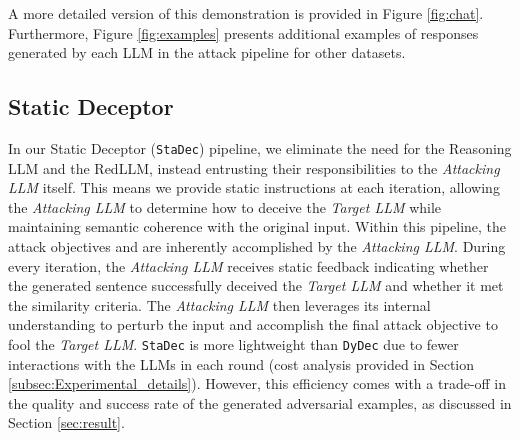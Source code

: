 \documentclass[11pt]{article}
\newcommand \dydec[0]{\texttt{DyDec}}
\newcommand \stadec[0]{\texttt{StaDec}}
\newcommand \targetLLM[0]{\textsl{Target LLM}}
\newcommand \attackingLLM[0]{\textsl{Attacking LLM}}
\begin{document}
A more detailed version of this demonstration is provided in Figure \ref{fig:chat}. Furthermore, Figure \ref{fig:examples} presents additional examples of responses generated by each LLM in the attack pipeline for other datasets.

\subsection{Static Deceptor}
\label{sec:stadec_description}

In our Static Deceptor (\stadec) pipeline, we eliminate the need for the Reasoning LLM and the RedLLM, instead entrusting their responsibilities to the \attackingLLM{} itself. This means we provide static instructions at each iteration, allowing the \attackingLLM{} to determine how to deceive the \targetLLM{} while maintaining semantic coherence with the original input. Within this pipeline, the attack objectives  and  are inherently accomplished by the \attackingLLM{}. During every iteration, the \attackingLLM{} receives static feedback indicating whether the generated sentence successfully deceived the \targetLLM{} and whether it met the similarity criteria. The \attackingLLM{} then leverages its internal understanding to perturb the input and accomplish the final attack objective  to fool the \targetLLM{}. \stadec{} is more lightweight than \dydec{} due to fewer interactions with the LLMs in each round (cost analysis provided in Section \ref{subsec:Experimental_details}). However, this efficiency comes with a trade-off in the quality and success rate of the generated adversarial examples, as discussed in Section \ref{sec:result}.
\end{document}

